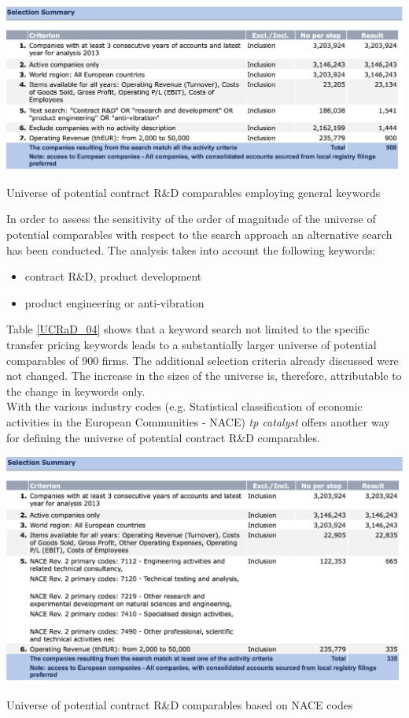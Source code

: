 \documentclass[12pt]{article}
\begin{document}
\begin{table}[!hbtp]
\centering
\includegraphics[width=1.0\textwidth]{./UCRaD_04.eps}
\caption{\footnotesize Universe of potential contract R\&D comparables employing general keywords}
\label{UCRaD_04}
\end{table}
In order to assess the sensitivity of the order of magnitude of the universe of potential comparables with respect to the search approach an alternative search has been conducted. The analysis takes into account the following keywords: \begin{itemize}
  \item contract R\&D, product development
  \item product engineering or anti-vibration
\end{itemize}
Table \ref{UCRaD_04} shows that a keyword search not limited to the specific transfer pricing keywords leads to a substantially larger universe of potential comparables of 900 firms. The additional selection criteria already discussed were not changed. The increase in the sizes of the universe is, therefore, attributable to the change in keywords only.\\[0.2cm]
With the various industry codes (e.g. Statistical classification of economic activities in the European Communities - NACE) \emph{tp catalyst} offers another way for defining the universe of potential contract R\&D comparables.
\begin{table}[!hbtp]
\centering
\includegraphics[width=1.0\textwidth]{./UCRaD_03a.eps}
\caption{\footnotesize Universe of potential contract R\&D comparables based on NACE codes}
\label{UCRaD_03b}
\end{table}
\end{document}

